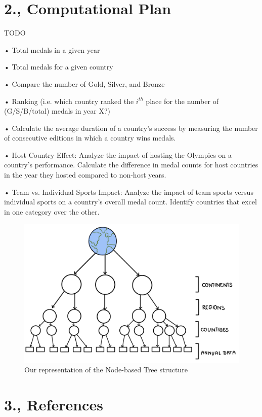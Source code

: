 \documentclass[fontsize=11pt]{article}
\begin{document}
\section*{2., Computational Plan}

TODO

 • Total medals in a given year

 • Total medals for a given country

 • Compare the number of Gold, Silver, and Bronze

 • Ranking (i.e. which country ranked the $i^{th}$ place for the number of (G/S/B/total) medals in year X?)

• Calculate the average duration of a country's success by measuring the number of consecutive editions in which a country wins medals. 

• Host Country Effect:
Analyze the impact of hosting the Olympics on a country's performance. Calculate the difference in medal counts for host countries in the year they hosted compared to non-host years.

• Team vs. Individual Sports Impact:
Analyze the impact of team sports versus individual sports on a country's overall medal count. Identify countries that excel in one category over the other.


\begin{figure}
    \centering
    \includegraphics[width=0.5\linewidth]{tree_representation.jpg}
    \caption{Our representation of the Node-based Tree structure}
    \label{fig:enter-label}
\end{figure}

\section*{3., References}
\end{document}
